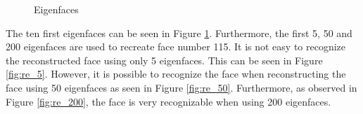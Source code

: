 \documentclass[a4paper,10pt]{article}
\begin{document}
\begin{figure}[H]
{  }
  \caption{Eigenfaces}
  \label{fig:eigenfaces}
\end{figure}

The ten first eigenfaces can be seen in Figure {\ref{fig:eigenfaces}}.
Furthermore, the first 5, 50 and 200 eigenfaces are used to
recreate face number 115. It is not easy to recognize the
reconstructed face using only  5 eigenfaces. This can be seen in
Figure {\ref{fig:re_5}}. However, it is possible to recognize
the face when reconstructing the face using 50
eigenfaces as seen in Figure {\ref{fig:re_50}}. Furthermore,
as observed in Figure {\ref{fig:re_200}}, the face is very
recognizable when using 200 eigenfaces.
\end{document}
